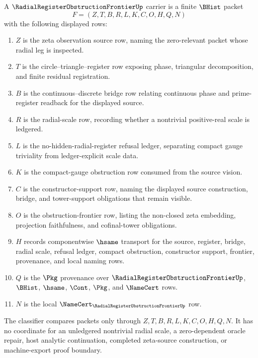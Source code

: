 \begin{definition}
\label{def:radial-register-obstruction-frontier-carrier}
A $\RadialRegisterObstructionFrontierUp$ carrier is a finite $\BHist$ packet
$$
F=(Z,T,B,R,L,K,C,O,H,Q,N)
$$
with the following displayed rows:
\begin{enumerate}
\item $Z$ is the zeta observation source row, naming the zero-relevant packet whose radial leg is inspected.
\item $T$ is the circle--triangle--register row exposing phase, triangular decomposition, and finite residual registration.
\item $B$ is the continuous--discrete bridge row relating continuous phase and prime-register readback for the displayed source.
\item $R$ is the radial-scale row, recording whether a nontrivial positive-real scale is ledgered.
\item $L$ is the no-hidden-radial-register refusal ledger, separating compact gauge triviality from ledger-explicit scale data.
\item $K$ is the compact-gauge obstruction row consumed from the source vision.
\item $C$ is the constructor-support row, naming the displayed source construction, bridge, and tower-support obligations that remain visible.
\item $O$ is the obstruction-frontier row, listing the non-closed zeta embedding, projection faithfulness, and cofinal-tower obligations.
\item $H$ records componentwise $\hsame$ transport for the source, register, bridge, radial scale, refusal ledger, compact obstruction, constructor support, frontier, provenance, and local naming rows.
\item $Q$ is the $\Pkg$ provenance over $\RadialRegisterObstructionFrontierUp$, $\BHist$, $\hsame$, $\Cont$, $\Pkg$, and $\NameCert$ rows.
\item $N$ is the local $\NameCert_{\RadialRegisterObstructionFrontierUp}$ row.
\end{enumerate}
The classifier compares packets only through $Z,T,B,R,L,K,C,O,H,Q,N$. It has no coordinate for an unledgered nontrivial radial scale, a zero-dependent oracle repair, host analytic continuation, completed zeta-source construction, or machine-export proof boundary.
\end{definition}


